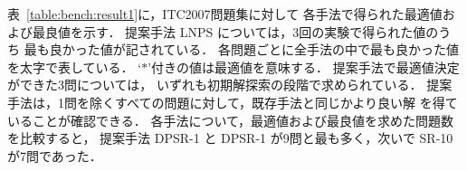
表~\ref{table:bench:result1}に，ITC2007問題集に対して
各手法で得られた最適値および最良値を示す．
提案手法 LNPS については，3回の実験で得られた値のうち
最も良かった値が記されている．
各問題ごとに全手法の中で最も良かった値を太字で表している．
`$\ast$'付きの値は最適値を意味する．
提案手法で最適値決定ができた3問については，
いずれも初期解探索の段階で求められている．
提案手法は，1問を除くすべての問題に対して，既存手法と同じかより良い解
を得ていることが確認できる．
各手法について，最適値および最良値を求めた問題数を比較すると，
提案手法 \textsf{DPSR-1} と \textsf{DPSR-1} が9問と最も多く，次いで
\textsf{SR-10}が7問であった．

